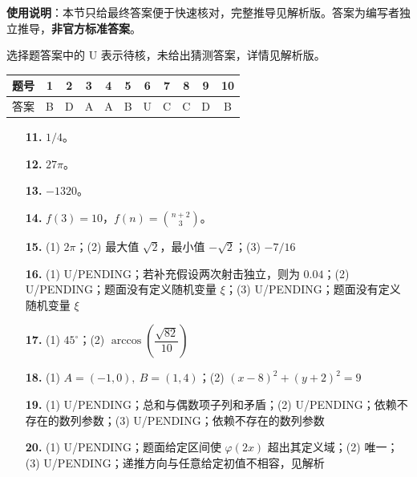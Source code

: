 
\begin{gknotice}
\textbf{使用说明}：本节只给最终答案便于快速核对，完整推导见解析版。答案为编写者独立推导，\textbf{非官方标准答案}。
\end{gknotice}

\begin{gknotice}
选择题答案中的 U 表示待核，未给出猜测答案，详情见解析版。
\end{gknotice}

\begin{center}\begin{tabular}{ccccccccccc}
\toprule
题号 & 1 & 2 & 3 & 4 & 5 & 6 & 7 & 8 & 9 & 10 \\
\midrule
答案 & B & D & A & A & B & U & C & C & D & B \\
\bottomrule
\end{tabular}\end{center}

\begin{itemize}[leftmargin=2.6em]
  \item[\textbf{11.}] $1/4$。
  \item[\textbf{12.}] $27\pi$。
  \item[\textbf{13.}] $-1320$。
  \item[\textbf{14.}] $f(3)=10$，$f(n)=\binom{n+2}{3}$。
\end{itemize}

\begin{itemize}[leftmargin=2.6em]
  \item[\textbf{15.}] (1) $2\pi$；(2) 最大值 $\sqrt2$，最小值 $-\sqrt2$；(3) $-7/16$
  \item[\textbf{16.}] (1) U/PENDING；若补充假设两次射击独立，则为 $0.04$；(2) U/PENDING；题面没有定义随机变量 $\xi$；(3) U/PENDING；题面没有定义随机变量 $\xi$
  \item[\textbf{17.}] (1) $45^\circ$；(2) $\arccos\left(\dfrac{\sqrt{82}}{10}\right)$
  \item[\textbf{18.}] (1) $A=(-1,0),\ B=(1,4)$；(2) $(x-8)^2+(y+2)^2=9$
  \item[\textbf{19.}] (1) U/PENDING；总和与偶数项子列和矛盾；(2) U/PENDING；依赖不存在的数列参数；(3) U/PENDING；依赖不存在的数列参数
  \item[\textbf{20.}] (1) U/PENDING；题面给定区间使 $\varphi(2x)$ 超出其定义域；(2) 唯一；(3) U/PENDING；递推方向与任意给定初值不相容，见解析
\end{itemize}
